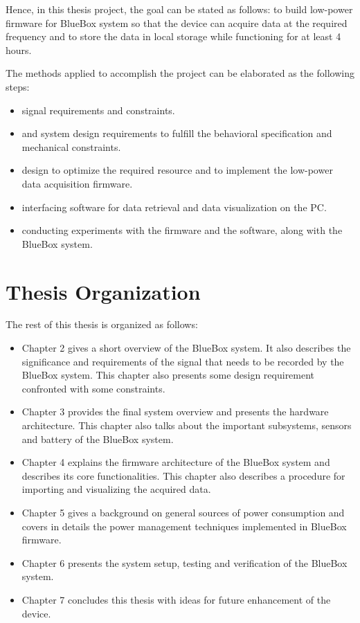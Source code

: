 Hence, in this thesis project, the goal can be stated as follows:
to build low-power firmware for BlueBox system so that the device can
acquire data at the required frequency and to store the data in local
storage while functioning for at least 4 hours. 
 
 The methods applied to accomplish the project can be elaborated as the following steps:
 \begin{itemize}
	\item signal requirements and constraints. 
 	
	\item and system design requirements to fulfill the behavioral
		specification and mechanical constraints.
 	
	\item design to optimize the required resource and to implement the
		low-power data acquisition firmware.
 	
	\item interfacing software for data retrieval and data
		visualization on the PC.
 	
	\item conducting experiments with the firmware and the software,
		along with the BlueBox system.
 \end{itemize}
 
\section{Thesis Organization}
The rest of this thesis is organized as follows:
\begin{itemize}
	\item Chapter 2 gives a short overview of the BlueBox system. It
		also describes the significance and requirements of the signal
		that needs to be recorded by the BlueBox system. This chapter
		also presents some design requirement confronted with some
		constraints.
	
	\item Chapter 3 provides the final system overview and presents the
		hardware architecture. This chapter also talks about the
		important subsystems, sensors and battery of the BlueBox system.
	
	\item Chapter 4 explains the firmware architecture of the BlueBox
		system and describes its core functionalities. This chapter also
		describes a procedure for importing and visualizing the acquired
		data.
	
	\item Chapter 5 gives a background on general sources of power
		consumption and covers in details the power management techniques
		implemented in BlueBox firmware.
	
	\item Chapter 6 presents the system setup, testing and verification
		of the BlueBox system. 
	
	\item Chapter 7 concludes this thesis with ideas for future
		enhancement of the device.
	
\end{itemize}
